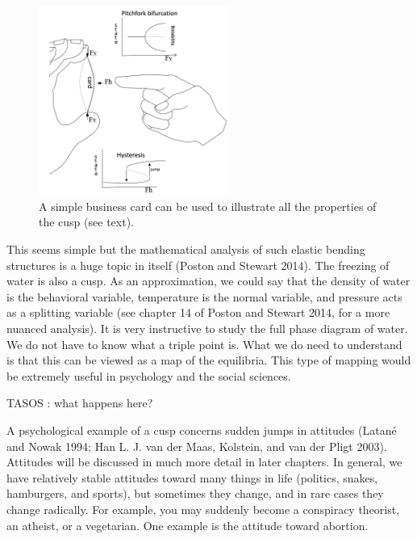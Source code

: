 \documentclass[
  letterpaper,
]{scrbook}
\begin{document}
\begin{figure}

{\centering \includegraphics[width=2.46713in,height=2.42993in]{media/ch3/image11.jpg}

}

\caption{\label{fig-ch3-img11-old-23}A simple business card can be used
to illustrate all the properties of the cusp (see text).}

\end{figure}

This seems simple but the mathematical analysis of such elastic bending
structures is a huge topic in itself (Poston and Stewart 2014). The
freezing of water is also a cusp. As an approximation, we could say that
the density of water is the behavioral variable, temperature is the
normal variable, and pressure acts as a splitting variable (see chapter
14 of Poston and Stewart 2014, for a more nuanced analysis). It is very
instructive to study the full phase diagram of water. We do not have to
know what a triple point is. What we do need to understand is that this
can be viewed as a map of the equilibria. This type of mapping would be
extremely useful in psychology and the social sciences.

TASOS : what happens here?

A psychological example of a cusp concerns sudden jumps in attitudes
(Latané and Nowak 1994; Han L. J. van der Maas, Kolstein, and van der
Pligt 2003). Attitudes will be discussed in much more detail in later
chapters. In general, we have relatively stable attitudes toward many
things in life (politics, snakes, hamburgers, and sports), but sometimes
they change, and in rare cases they change radically. For example, you
may suddenly become a conspiracy theorist, an atheist, or a vegetarian.
One example is the attitude toward abortion.
\end{document}
